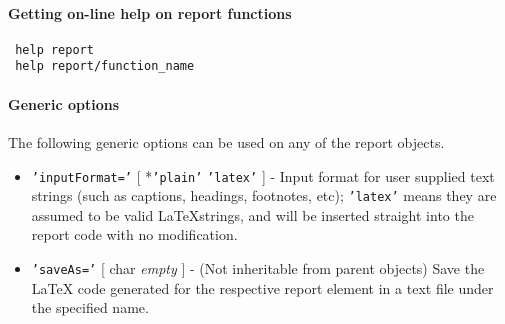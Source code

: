  \paragraph{Getting on-line help on report functions}
 
 \begin{verbatim}
 help report
 help report/function_name
 \end{verbatim}
 
 \paragraph{Generic options}
 
 The following generic options can be used on any of the report objects.
 
 \begin{itemize}
 \item
   \texttt{'inputFormat='} {[} *\texttt{'plain'} \textbar{}
   \texttt{'latex'} {]} - Input format for user supplied text strings
   (such as captions, headings, footnotes, etc); \texttt{'latex'} means
   they are assumed to be valid \LaTeX strings, and will be inserted
   straight into the report code with no modification.
 \item
   \texttt{'saveAs='} {[} char \textbar{} \emph{empty} {]} - (Not
   inheritable from parent objects) Save the LaTeX code generated for the
   respective report element in a text file under the specified name.
 \end{itemize}



